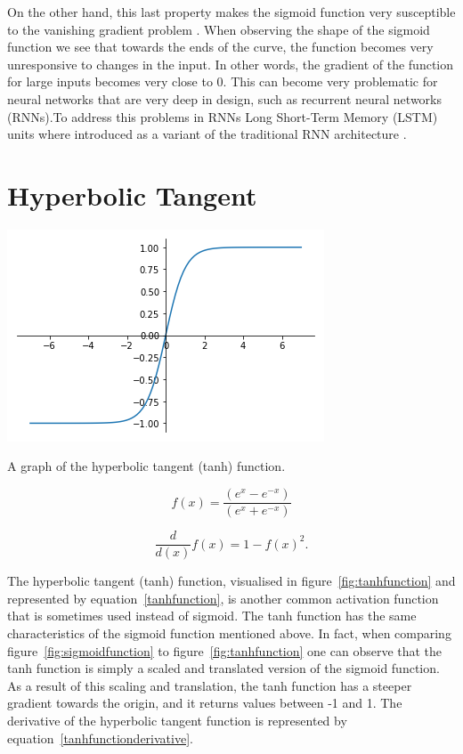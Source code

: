 On the other hand, this last property makes the sigmoid function very susceptible to the vanishing gradient problem \citep{bengio94}. When observing the shape of the sigmoid function we see that towards the ends of the curve, the function becomes very unresponsive to changes in the input. In other words, the gradient of the function for large inputs becomes very close to 0. This can become very problematic for neural networks that are very deep in design, such as recurrent neural networks (RNNs).To address this problems in RNNs Long Short-Term Memory (LSTM) units where introduced as a variant of the traditional RNN architecture \citep{hochreiter1997long}.

\section{Hyperbolic Tangent}\label{sec:tanh}
\begin{marginfigure}
  \includegraphics{graphics/activation_functions/tanh_function.png}
  \caption{
    A graph of the hyperbolic tangent (tanh) function.
  }
  \label{fig:tanhfunction}
\end{marginfigure}

\begin{equation}\label{tanhfunction}
    f(x) = \frac{(e^{x} - e^{-x})}{(e^{x} + e^{-x})}
\end{equation}

\begin{equation}\label{tanhfunctionderivative}
    \frac{d}{d(x)}f(x) = 1-f(x)^2.
\end{equation}

The hyperbolic tangent (tanh) function, visualised in figure~\ref{fig:tanhfunction} and represented by equation~\ref{tanhfunction}, is another common activation function that is sometimes used instead of sigmoid. The tanh function has the same characteristics of the sigmoid function mentioned above. In fact, when comparing figure~\ref{fig:sigmoidfunction} to figure~\ref{fig:tanhfunction} one can observe that the tanh function is simply a scaled and translated version of the sigmoid function. As a result of this scaling and translation, the tanh function has a steeper gradient towards the origin, and it returns values between -1 and 1. The derivative of the hyperbolic tangent function is represented by equation~\ref{tanhfunctionderivative}.

